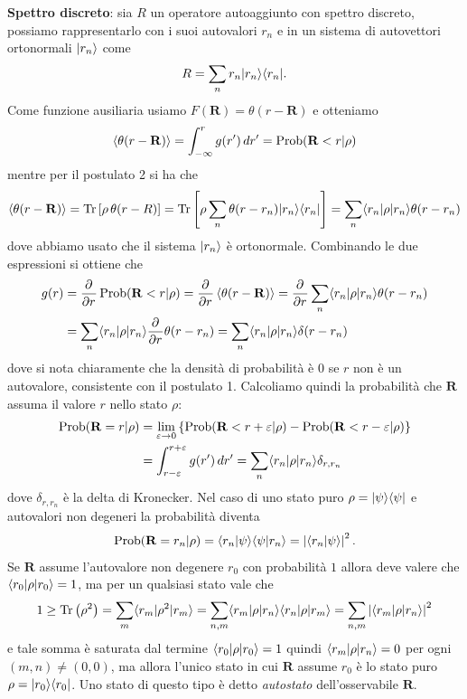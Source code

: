\textbf{Spettro discreto}: sia $ R $ un operatore autoaggiunto con spettro discreto, possiamo rappresentarlo con i suoi autovalori $ r_n $ e in un sistema 
di autovettori ortonormali $ \vert r_n \rangle $ come 
\begin{align*}
  R = \sum_n r_n \vert r_n \rangle \langle r_n \vert.
\end{align*}
Come funzione ausiliaria usiamo $ F(\mathbf{R}) = \theta(r - \mathbf{R}) $ e otteniamo 
\begin{align*}
  \left< \theta(r - \mathbf{R}) \right> = \int_{-\infty}^{r} g(r') \,dr' = \operatorname{\textnormal{Prob}} (\mathbf{R} < r \vert \rho)
\end{align*}
mentre per il postulato 2 si ha che
\begin{align*}
  \left< \theta(r - \mathbf{R}) \right> = \operatorname{\textnormal{Tr}}\left[ \rho \,\theta(r - R) \right] = \operatorname{\textnormal{Tr}} \left[ \rho \sum_n \theta(r - r_n) \vert r_n \rangle \langle r_n \vert \right] 
  = \sum_n \langle r_n \vert \rho \vert r_n \rangle \theta(r - r_n)
\end{align*}
dove abbiamo usato che il sistema $ \vert r_n \rangle $ è ortonormale. Combinando le due espressioni si ottiene che 
\begin{align*}
  g(r) &= \frac{\partial^{} {}}{\partial {r}^{}} \operatorname{\textnormal{Prob}} (\mathbf{R} < r \vert \rho) = \frac{\partial^{} {}}{\partial {r}^{}} \left< \theta(r - \mathbf{R}) \right> = \frac{\partial^{} {}}{\partial {r}^{}} \sum_n \langle r_n \vert \rho \vert r_n \rangle \theta(r - r_n)
  \\
  &= \sum_n \langle r_n \vert \rho \vert r_n \rangle \frac{\partial^{} {}}{\partial {r}^{}} \theta(r - r_n) = \sum_n \langle r_n \vert \rho \vert r_n \rangle \delta(r - r_n) 
\end{align*}
dove si nota chiaramente che la densità di probabilità è $ 0 $ se $ r $ non è un autovalore, consistente con il postulato 1. Calcoliamo quindi la 
probabilità che $ \mathbf{R} $ assuma il valore $ r $ nello stato $ \rho $:
\begin{align*}
  \operatorname{\textnormal{Prob}}(\mathbf{R} = r \vert \rho) &= \lim_{\varepsilon \to 0} \left\{\operatorname{\textnormal{Prob}}(\mathbf{R} < r + \varepsilon \vert \rho) - \operatorname{\textnormal{Prob}}(\mathbf{R} < r - \varepsilon \vert \rho) \right\}
  \\
  &= \int_{r-\varepsilon}^{r + \varepsilon} g(r')\,dr' = \sum_n \langle r_n \vert \rho \vert r_n \rangle \delta_{r,r_n}
\end{align*}
dove $ \delta_{r,r_n} $ è la delta di Kronecker. Nel caso di uno stato puro $ \rho = \vert \psi \rangle \langle \psi \vert $ e autovalori non degeneri la probabilità diventa 
\begin{align*}
  \operatorname{\textnormal{Prob}}(\mathbf{R} = r_n \vert \rho) = \langle r_n|\psi \rangle \langle \psi|r_n \rangle = \left|{\langle r_n|\psi \rangle}\right|^2.
\end{align*}
Se $ \mathbf{R} $ assume l'autovalore non degenere $ r_0 $ con probabilità $ 1 $ allora deve valere che $ \langle r_0 \vert \rho \vert r_0 \rangle = 1 $, 
ma per un qualsiasi stato vale che 
\begin{align*}
  1 \geq \operatorname{\textnormal{Tr}}\left( \rho^2 \right) = \sum_{m} \langle r_m \vert \rho^2 \vert r_m \rangle = \sum_{n,m} \langle r_m \vert \rho \vert r_n \rangle \langle r_n \vert \rho \vert r_m \rangle 
  = \sum_{n,m} \left|{\langle r_m \vert \rho \vert r_n \rangle}\right|^2
\end{align*}
e tale somma è saturata dal termine $ \langle r_0 \vert \rho \vert r_0 \rangle = 1 $ quindi $ \langle r_m \vert \rho \vert r_n \rangle = 0 $ per ogni $ (m,n) \neq (0,0) $, ma allora l'unico stato 
in cui $ \mathbf{R} $ assume $ r_0 $ è lo stato puro $ \rho = \vert r_0 \rangle \langle r_0 \vert $. Uno stato di questo tipo è detto \textit{autostato} 
dell'osservabile $ \mathbf{R} $.

